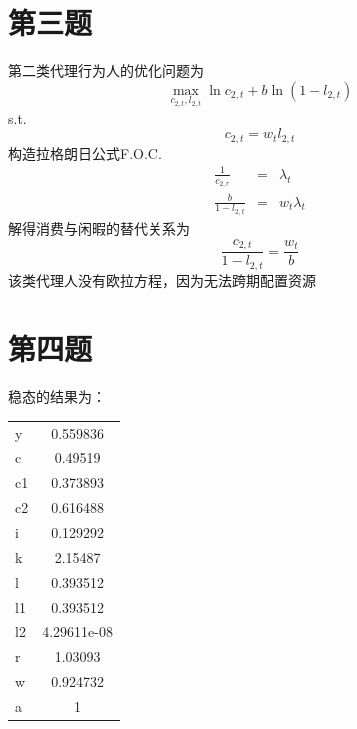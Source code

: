 \documentclass[a4paper,12pt]{ctexart}
\begin{document}
\section*{第三题}
第二类代理行为人的优化问题为
\begin{equation*}
    \max_{c_{2,t},l_{2,t}} \ln c_{2,t}+b \ln (1-l_{2,t})
\end{equation*}
s.t.
\begin{equation*}
    c_{2,t}=w_tl_{2,t}
\end{equation*}
构造拉格朗日公式F.O.C.
\begin{eqnarray*}
    \frac{1}{c_{2,r}}&=&\lambda_t\\
    \frac{b}{1-l_{2,t}}&=&w_t\lambda_t
\end{eqnarray*}
解得消费与闲暇的替代关系为
\begin{equation*}
    \frac{c_{2,t}}{1-l_{2,t}}=\frac{w_t}{b}
\end{equation*}
该类代理人没有欧拉方程，因为无法跨期配置资源
\section*{第四题}
稳态的结果为：
\begin{table}[H]
    \centering
    \begin{tabular}{l|c}
        y  & 0.559836    \\
        c  & 0.49519     \\
        c1 & 0.373893    \\
        c2 & 0.616488    \\
        i  & 0.129292    \\
        k  & 2.15487     \\
        l  & 0.393512    \\
        l1 & 0.393512    \\
        l2 & 4.29611e-08 \\
        r  & 1.03093     \\
        w  & 0.924732    \\
        a  & 1           \\
    \end{tabular}
\end{table}
\end{document}
